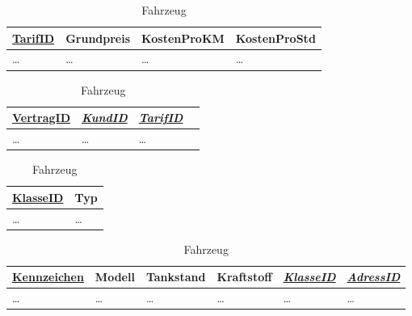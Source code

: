\begin{table}
	\centering
	\caption{Tarif}\label{table:Tarif_main}
	\begin{tabular}{l l l l} \toprule
		\underline{TarifID} & Grundpreis & KostenProKM & KostenProStd \\ 
		\midrule
		\dots &  \dots & \dots  & \dots  \\
		\bottomrule
	\end{tabular}

	\parbox{.45\linewidth}{
		\centering
		\caption{Vertrag}\label{table:Vertrag_main}
		\begin{tabular}{l l l l} \toprule
		\underline{VertragID} &  \textit{\underline{KundID}} & \textit{\underline{TarifID}} \\ 
		\midrule
		\dots &  \dots & \dots  \\
		\bottomrule
		\end{tabular}
	}
	\parbox{.45\linewidth}{
		\centering
		\caption{Fahrzeugklasse}\label{table:Fahrzeugklasse_main}
		\begin{tabular}{l l} \toprule
			\underline{KlasseID} & Typ\\ 
			\midrule
			\dots &  \dots \\
			\bottomrule
		\end{tabular}
	}

	\centering
	\caption{Fahrzeug}\label{table:Fahrzeug_main}
	\begin{tabular}{l l l l l l} \toprule
		\underline{Kennzeichen} & Modell & Tankstand & Kraftstoff &  \textit{\underline{KlasseID}} & \textit{\underline{AdressID}} \\ 
		\midrule
		\dots &  \dots & \dots  & \dots &  \dots & \dots  \\
		\bottomrule
	\end{tabular}
\end{table}

